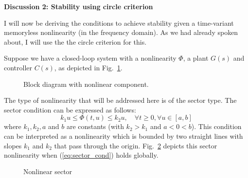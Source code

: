 \documentclass[12pt]{article}
\begin{document}
\vspace{1cm}
\textbf{Discussion 2: Stability using circle criterion}

I will now be deriving the conditions to achieve stability given a time-variant memoryless nonlinearity (in the frequency domain). As we had already spoken about, I will use the the circle criterion for this. 

Suppose we have a closed-loop system with a nonlinearity $\Phi$, a plant $G(s)$ and controller $C(s)$, as depicted in Fig.~\ref{fig:nl_block}. 
\begin{figure}
\centering
\resizebox{1\columnwidth}{!}{}
\caption{Block diagram with nonlinear component.}
\label{fig:nl_block}
\end{figure}

The type of nonlinearity that will be addressed here is of the sector type. The sector condition can be expressed as follows:
\begin{equation} \label{eq:sector_cond}
k_1 u \leq \Phi(t,u) \leq k_2 u, \quad \forall t \geq 0, \forall u \in [a,b] 
\end{equation}
where $k_1, k_2, a$ and $b$ are constants (with $k_2 > k_1$ and $a < 0 < b$). This condition can be interpreted as a nonlinearity which is bounded by two straight lines with slopes $k_1$ and $k_2$ that pass through the origin. Fig.~\ref{fig:nl_graph} depicts this sector nonlinearity when (\ref{eq:sector_cond}) holds globally.  
\begin{figure}
\centering
\resizebox{1\columnwidth}{!}{}
\caption{Nonlinear sector}
\label{fig:nl_graph}
\end{figure}
\end{document}
